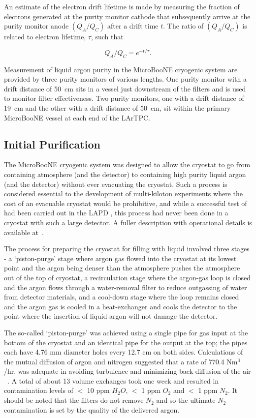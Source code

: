 An estimate of the electron drift lifetime is made by measuring the fraction of electrons generated at the purity monitor cathode that subsequently arrive at the purity monitor anode $(Q_A/Q_C)$ after a drift time $t$. The ratio of $(Q_A/Q_C)$ is related to electron lifetime, $\tau$, such that

\begin{equation}
Q_A/Q_C = e^{-t/\tau}.
\end{equation}

Measurement of liquid argon purity in the MicroBooNE cryogenic system are provided by three purity monitors of various lengths. One purity monitor with a drift distance of 50~cm sits in a vessel just downstream of the filters and is used to monitor filter effectiveness. Two purity monitors, one with a drift distance of 19~cm and the other with a drift distance of 50~cm, sit within the primary MicroBooNE vessel at each end of the LArTPC.


 \subsection{Initial Purification}
 The MicroBooNE cryogenic system was designed to allow the cryostat to go from containing atmosphere (and the detector) to containing high purity liquid argon (and the detector) without ever evacuating the cryostat. Such a process is considered essential to the development of multi-kiloton experiments where the cost of an evacuable cryostat would be prohibitive, and while a successful test of had been carried out in the LAPD \cite{Adamowski:2014-LAPD}, this process had never been done in a cryostat with such a large detector.  A fuller description with operational details is available at~\cite{zuckerbrot}.

The process for preparing the cryostat for filling with liquid involved three stages - a `piston-purge' stage where argon gas flowed into the cryostat at its lowest point and the argon being denser than the atmosphere pushes the atmosphere out of the top of cryostat, a recirculation stage where the argon-gas loop is closed and the argon flows through a water-removal filter to reduce outgassing of water from detector materials, and a cool-down stage where the loop remains closed and the argon gas is cooled in a heat-exchanger and cools the detector to the point where the insertion of liquid argon will not damage the detector.

The so-called `piston-purge' was achieved using a single pipe for gas input at the bottom of the cryostat and an identical pipe for the output at the top; the pipes each have 4.76 mm diameter holes every 12.7 cm on both sides.  Calculations of the mutual diffusion of argon and nitrogen suggested that a rate of 770.4 Nm$^3$/hr. was adequate in avoiding turbulence and minimizing back-diffusion of the air ~\cite{voirin}. A total of about 13 volume exchanges took one week and resulted in contamination levels of $<$ 10 ppm $H_2 O$, $<$ 1 ppm $O_2$ and $<$ 1 ppm $N_2$. It should be noted that the filters do not remove $N_2$ and so the ultimate $N_2$ contamination  is set by the quality of the delivered argon. 

